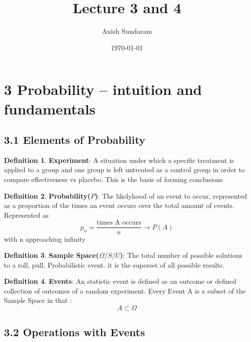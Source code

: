 \documentclass[12pt]{amsart}
\title{Lecture 3 and 4}
\author{Anish Sundaram}
\date{\today}
\theoremstyle{definition}
\newtheorem{definition}{Definition} %
\numberwithin{equation}{theorem}    %
\begin{document}
\maketitle

\tableofcontents

\section*{3 Probability – intuition and fundamentals}
\subsection*{3.1 Elements of Probability}

\begin{definition}
    \textbf{Experiment}:
    A situation under which a specific treatment is applied to a group and one group is left untreated as a control group in order to compare effectiveness vs placebo. This is the basis of forming conclusions
\end{definition}

\begin{definition}
    \textbf{Probability($P$)}:
    The likelyhood of an event to occur, represented as a proportion of the times an event occurs over the total amount of events. Represented as 
    $$p_n = \frac{\text{times A occurs}}{n} \longrightarrow P(A)$$ with n approaching infinity
\end{definition}

\begin{definition}
    \textbf{Sample Space($\Omega/S/U$)}:
    The total number of possible solutions to a roll, pull, Probabilistic event. it is the superset of all possible results.
\end{definition}


\begin{definition}
    \textbf{Events}:
    An statistic event is defined as an outcome or defined collection of outcomes of a random experiment. Every Event A is a subset of the Sample Space in that : $$A \subset \Omega$$
\end{definition}

\subsection*{3.2 Operations with Events}
\end{document}
